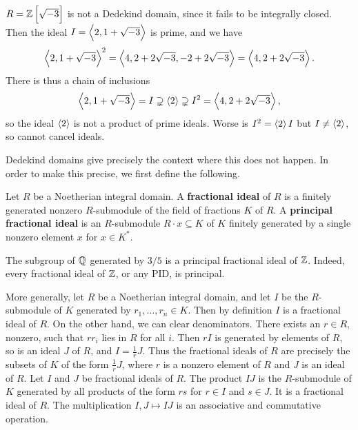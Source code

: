 \begin{example*}
$ R = \Z\sbr{\sqrt{-3}} $ is not a Dedekind domain, since it fails to be integrally closed. Then the ideal $ I = \left\langle 2, 1 + \sqrt{-3} \right\rangle $ is prime, and we have
$$ \left\langle 2, 1 + \sqrt{-3} \right\rangle^2 = \left\langle 4, 2 + 2\sqrt{-3}, -2 + 2\sqrt{-3} \right\rangle = \left\langle 4, 2 + 2\sqrt{-3} \right\rangle. $$
There is thus a chain of inclusions
$$ \left\langle 2, 1 + \sqrt{-3} \right\rangle = I \supsetneq \left\langle 2 \right\rangle \supsetneq I^2 = \left\langle 4, 2 + 2\sqrt{-3} \right\rangle, $$
so the ideal $ \left\langle 2 \right\rangle $ is not a product of prime ideals. Worse is $ I^2 = \left\langle 2 \right\rangle I $ but $ I \ne \left\langle 2 \right\rangle $, so cannot cancel ideals.
\end{example*}

Dedekind domains give precisely the context where this does not happen. In order to make this precise, we first define the following.

\begin{definition}
Let $ R $ be a Noetherian integral domain. A \textbf{fractional ideal} of $ R $ is a finitely generated nonzero $ R $-submodule of the field of fractions $ K $ of $ R $. A \textbf{principal fractional ideal} is an $ R $-submodule $ R \cdot x \subseteq K $ of $ K $ finitely generated by a single nonzero element $ x $ for $ x \in K^* $.
\end{definition}

\begin{example*}
The subgroup of $ \mathbb{Q} $ generated by $ 3 / 5 $ is a principal fractional ideal of $ \mathbb{Z} $. Indeed, every fractional ideal of $ \mathbb{Z} $, or any PID, is principal.
\end{example*}

More generally, let $ R $ be a Noetherian integral domain, and let $ I $ be the $ R $-submodule of $ K $ generated by $ r_1, \dots, r_n \in K $. Then by definition $ I $ is a fractional ideal of $ R $. On the other hand, we can clear denominators. There exists an $ r \in R $, nonzero, such that $ rr_i $ lies in $ R $ for all $ i $. Then $ rI $ is generated by elements of $ R $, so is an ideal $ J $ of $ R $, and $ I = \tfrac{1}{r}J $. Thus the fractional ideals of $ R $ are precisely the subsets of $ K $ of the form $ \tfrac{1}{r}J $, where $ r $ is a nonzero element of $ R $ and $ J $ is an ideal of $ R $. Let $ I $ and $ J $ be fractional ideals of $ R $. The product $ IJ $ is the $ R $-submodule of $ K $ generated by all products of the form $ rs $ for $ r \in I $ and $ s \in J $. It is a fractional ideal of $ R $. The multiplication $ I, J \mapsto IJ $ is an associative and commutative operation.

